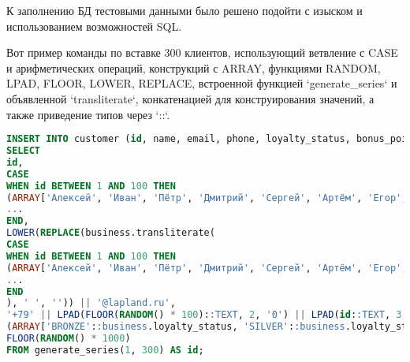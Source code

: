 К заполнению БД тестовыми данными было решено подойти с изыском и использованием возможностей SQL\@.

Вот пример команды по вставке 300 клиентов, использующий ветвление с CASE и арифметических операций,
конструкций с ARRAY, функциями RANDOM, LPAD, FLOOR, LOWER, REPLACE, встроенной функцией `generate\_series`
и объявленной `transliterate`, конкатенацией для конструирования значений, а также приведение типов через `::`.

\begin{lstlisting}[language=sql, frame=single, basicstyle=\small\ttfamily, breaklines=true,label={lst:examplecustomer}]
INSERT INTO customer (id, name, email, phone, loyalty_status, bonus_points)
SELECT
id,
CASE
WHEN id BETWEEN 1 AND 100 THEN
(ARRAY['Алексей', 'Иван', 'Пётр', 'Дмитрий', 'Сергей', 'Артём', 'Егор', 'Михаил', 'Олег', 'Владимир'])[(id - 1) % 10 + 1]
...
END,
LOWER(REPLACE(business.transliterate(
CASE
WHEN id BETWEEN 1 AND 100 THEN
(ARRAY['Алексей', 'Иван', 'Пётр', 'Дмитрий', 'Сергей', 'Артём', 'Егор', 'Михаил', 'Олег', 'Владимир'])[(id - 1) % 10 + 1]
...
END
), ' ', '')) || '@lapland.ru',
'+79' || LPAD(FLOOR(RANDOM() * 100)::TEXT, 2, '0') || LPAD(id::TEXT, 3, '0') || LPAD(FLOOR(RANDOM() * 10000)::TEXT, 4, '0'),
(ARRAY['BRONZE'::business.loyalty_status, 'SILVER'::business.loyalty_status, 'GOLD'::business.loyalty_status])[FLOOR(RANDOM() * 3 + 1)],
FLOOR(RANDOM() * 1000)
FROM generate_series(1, 300) AS id;
\end{lstlisting}